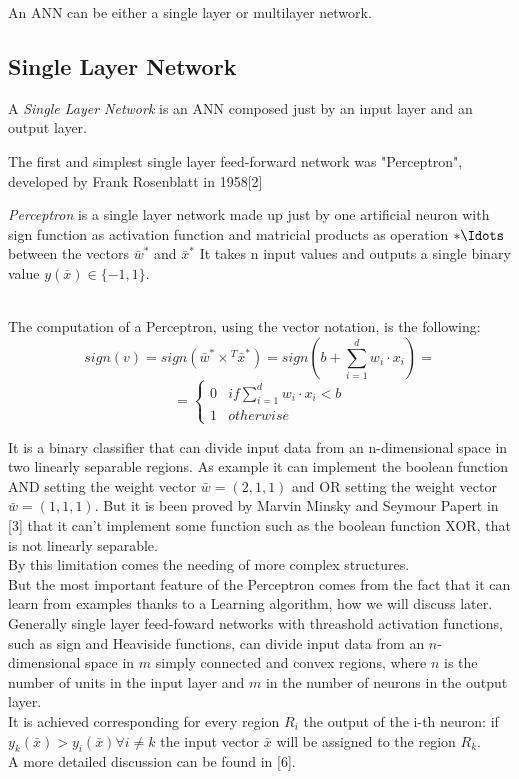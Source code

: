 An ANN can be either a single layer or multilayer network.


\subsection{Single Layer Network}

\begin{defn}
A \emph{Single Layer Network} is an ANN composed just by an input layer and an output layer.
\end{defn}


The first and simplest single layer feed-forward network was "Perceptron", developed by Frank Rosenblatt in 1958[2]
\begin{defn}
	\emph{Perceptron} is a single layer network made up just by one artificial neuron with sign function as activation function and matricial products as operation $ *\Idots$ between the vectors $\bar{w}^*$ and $\bar{x}^*$
	It takes n input values and outputs a single binary value $y(\bar{x}) \in \{-1,1\}$.
\end{defn}
{}\\
The computation of a Perceptron, using the vector notation, is the following:
$$sign(v)=sign(\bar{w}^* \times {}^T\bar{x}^*)=sign(b+ \sum_{i=1}^d w_i \cdot x_i) = $$
$$=\begin{cases} 0 & if {} \sum_{i=1}^d w_i \cdot x_i<b \\ 1 & otherwise \end{cases}$$

It is a binary classifier that can divide input data from an n-dimensional space in two linearly separable regions. As example it can implement the boolean function AND setting the weight vector $\bar{w}=(2,1,1)$ and OR setting the weight vector $\bar{w}=(1,1,1)$. But it is been proved by Marvin Minsky and Seymour Papert in [3] that it can't implement some function such as the boolean function XOR, that is not linearly separable. \\
By this limitation comes the needing of more complex structures.\\
But the most important feature of the Perceptron comes from the fact that it can learn from examples thanks to a Learning algorithm, how we will discuss later.\\

Generally single layer feed-foward networks with threashold activation functions, such as sign and Heaviside functions, can divide input data from an $n$-dimensional space in $m$ simply connected and convex regions, where $n$ is the number of units in the input layer and $m$ in the number of neurons in the output layer.\\
It is achieved corresponding for every region $R_i$ the output of the i-th neuron: if $y_k(\bar{x})>y_i(\bar{x}) \forall i\neq k$ the input vector $\bar{x}$ will be assigned to the region $R_k$.\\
A more detailed discussion can be found in [6].


